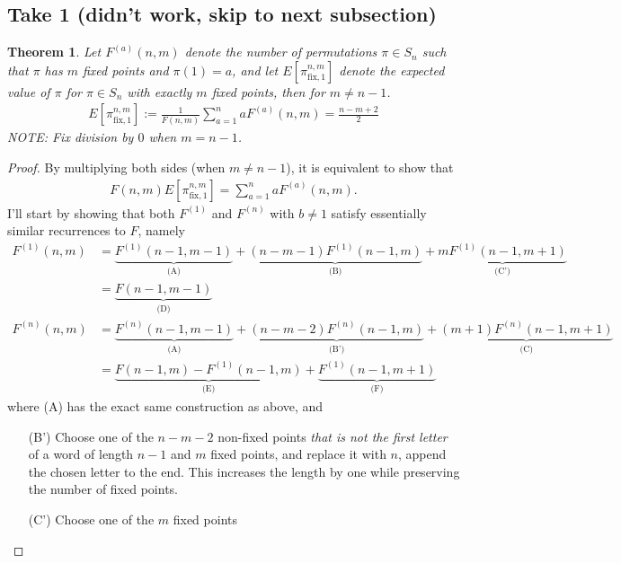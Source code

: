 \documentclass{article}
\newtheorem{theorem}[theo]{Theorem}
\begin{document}
\subsection{Take 1 (didn't work, skip to next subsection)}
\begin{theorem}
  Let $F^{(a)}(n, m)$ denote the number of permutations $\pi \in S_n$ such that
  $\pi$ has $m$ fixed points and $\pi(1) = a$, and
  let $E[\pi_{\text{fix},1}^{n,m}]$ denote the expected value of $\pi$ for
  $\pi \in S_n$ with exactly $m$ fixed points, then for $m \neq n - 1$.
  \begin{align}
    E[\pi_{\text{fix},1}^{n,m}] := \frac{1}{F(n,m)}\sum_{a=1}^n aF^{(a)}(n, m) = \frac{n - m + 2}{2}
  \end{align}
  NOTE: Fix division by $0$ when $m = n - 1$.
\end{theorem}
\begin{proof}
  By multiplying both sides (when $m \neq n - 1$), it is equivalent to show that \begin{align}
    F(n,m)E[\pi_{\text{fix},1}^{n,m}] = \sum_{a=1}^n aF^{(a)}(n, m).
  \end{align}
  I'll start by showing that both $F^{(1)}$ and $F^{(n)}$ with $b \neq 1$
  satisfy essentially similar recurrences to $F$, namely
  \begin{align}
    F^{(1)}(n, m) &=
      \underbrace{F^{(1)}(n - 1, m-1)}_{\text{(A)}} +
      \underbrace{(n - m - 1)F^{(1)}(n - 1, m)}_{\text{(B)}} +
      \underbrace{mF^{(1)}(n-1, m + 1)}_{\text{(C')}} \\
    &=
      \underbrace{F(n-1,m-1)}_{\text{(D)}} \\
    F^{(n)}(n, m) &=
    \underbrace{F^{(n)}(n - 1, m-1)}_{\text{(A)}} +
    \underbrace{(n - m - 2)F^{(n)}(n - 1, m)}_{\text{(B')}} +
    \underbrace{(m + 1)F^{(n)}(n-1, m + 1)}_{\text{(C)}} \\
    &= \underbrace{F(n-1,m) - F^{(1)}(n-1, m)}_{\text{(E)}} + \underbrace{F^{(1)}(n-1, m+1)}_{\text{(F)}}
  \end{align} where (A) has the exact same construction as above, and
  \begin{enumerate}[(A')]
    \item[(B')]
    Choose one of the $n - m - 2$ non-fixed points
    \textit{that is not the first letter} of a word of length $n-1$ and $m$
    fixed points, and replace it with $n$, append the chosen letter to the end.
    This increases the length by one while preserving the number of fixed points.
    \item[(C')] Choose one of the $m$ fixed points

\end{enumerate}
\end{proof}
\end{document}
